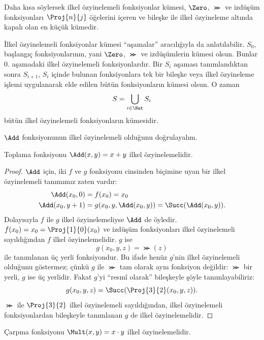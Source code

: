 \documentclass[../../../include/open-logic-section]{subfiles}
\begin{document}
\begin{explain}
Daha kısa söylersek ilkel özyinelemeli fonksiyonlar kümesi, $\Zero$,
$\Succ$ ve izdüşüm fonksiyonları $\Proj{n}{j}$ öğelerini içeren ve bileşke
ile ilkel özyineleme altında kapalı olan en küçük kümedir.

İlkel özyinelemeli fonksiyonlar kümesi ``aşamalar'' aracılığıyla da
anlatılabilir. $S_0$, başlangıç fonksiyonlarının, yani $\Zero$, $\Succ$ ve
izdüşümlerin kümesi olsun. Bunlar $0$. aşamadaki ilkel özyinelemeli
fonksiyonlardır. Bir $S_i$ aşaması tanımlandıktan sonra $S_{i+1}$, $S_i$
içinde bulunan fonksiyonlara tek bir bileşke veya ilkel özyineleme işlemi
uygulanarak elde edilen bütün fonksiyonların kümesi olsun. O zaman
\[
  S=\bigcup_{i\in\Nat}S_i
\]
bütün ilkel özyinelemeli fonksiyonların kümesidir.
\end{explain}

$\Add$ fonksiyonunun ilkel özyinelemeli olduğunu doğrulayalım.

\begin{prop}
  Toplama fonksiyonu $\Add(x,y)=x+y$ ilkel özyinelemelidir.
\end{prop}

\begin{proof}
$\Add$ için, iki $f$ ve $g$ fonksiyonu cinsinden
 biçimine uyan bir ilkel özyinelemeli tanımımız
zaten vardır:
\begin{align*}
  \Add(x_0,0) & = f(x_0)=x_0 \\
  \Add(x_0,y+1) & = g(x_0,y,\Add(x_0,y))=\Succ(\Add(x_0,y)).
\end{align*}
Dolayısıyla $f$ ile $g$ ilkel özyinelemeliyse $\Add$ de öyledir.
$f(x_0)=x_0=\Proj{1}{0}(x_0)$ ve izdüşüm fonksiyonları ilkel özyinelemeli
sayıldığından $f$ ilkel özyinelemelidir. $g$ ise
\[
  g(x_0,y,z)=\Succ(z)
\]
ile tanımlanan üç yerli fonksiyondur. Bu ifade henüz $g$'nin ilkel
özyinelemeli olduğunu göstermez; çünkü $g$ ile $\Succ$ tam olarak aynı
fonksiyon değildir: $\Succ$ bir yerli, $g$ ise üç yerlidir. Fakat $g$'yi
``resmî olarak'' bileşkeyle şöyle tanımlayabiliriz:
\[
  g(x_0,y,z)=\Succ(\Proj{3}{2}(x_0,y,z)).
\]
$\Succ$ ile $\Proj{3}{2}$ ilkel özyinelemeli sayıldığından, ilkel
özyinelemeli fonksiyonlardan bileşkeyle tanımlanan $g$ de ilkel
özyinelemelidir.
\end{proof}

\begin{prop}
  Çarpma fonksiyonu $\Mult(x,y)=x\cdot y$ ilkel özyinelemelidir.
\end{prop}
\end{document}
